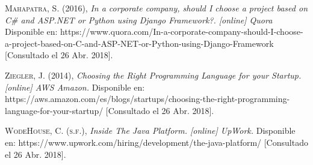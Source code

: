  \textsc{Mahapatra, S. (2016)}, 
\textit{In a corporate company, should I choose a project based on C\# and ASP.NET or Python using Django Framework?. [online] Quora}
Disponible en: https://www.quora.com/In-a-corporate-company-should-I-choose-a-project-based-on-C-and-ASP-NET-or-Python-using-Django-Framework [Consultado el 26 Abr. 2018].

 \textsc{Ziegler, J. (2014)}, 
\textit{Choosing the Right Programming Language for your Startup. [online] AWS Amazon. }
Disponible en: https://aws.amazon.com/es/blogs/startups/choosing-the-right-programming-language-for-your-startup/ [Consultado el 26 Abr. 2018].

 \textsc{ WodeHouse, C. (s.f.)}, 
\textit{Inside The Java Platform. [online] UpWork. }
Disponible en: https://www.upwork.com/hiring/development/the-java-platform/ [Consultado el 26 Abr. 2018].




